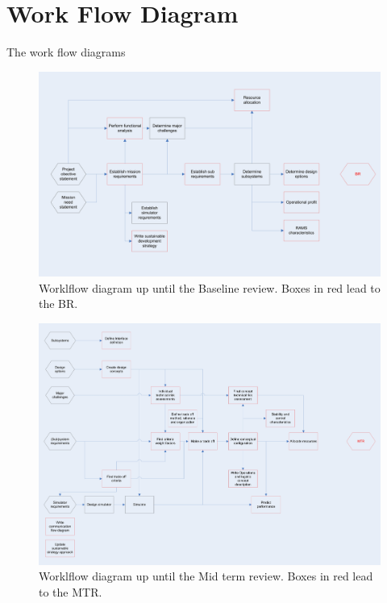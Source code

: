 \section{Work Flow Diagram}
\label{dsePPWFD}
The work flow diagrams

\newpage
\begin{figure}
\begin{center}
\includegraphics[width=1.2\textwidth, angle=90]{chapters/img/Workflow_diagram_BR.jpg}
\end{center}
\caption{Worklflow diagram up until the Baseline review. Boxes in red lead to the BR.}
\end{figure}

\newpage
\begin{figure}
\begin{center}
\includegraphics[width=1.2\textwidth, angle=90]{chapters/img/Workflow_diagram_MTR.jpg}
\end{center}
\caption{Worklflow diagram up until the Mid term review. Boxes in red lead to the MTR.}
\end{figure}

